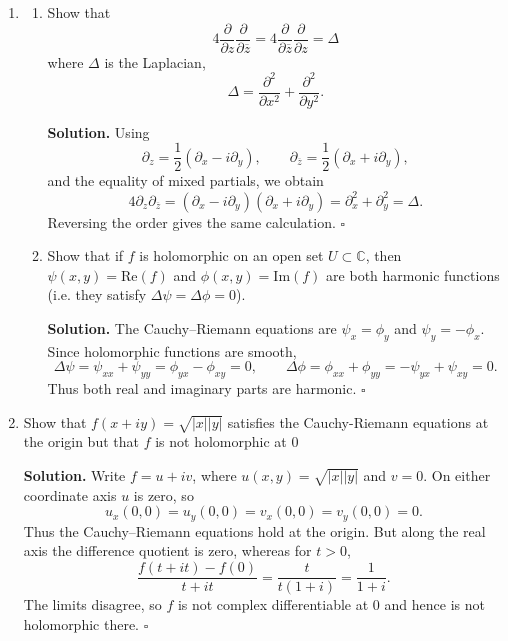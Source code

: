 \documentclass[12pt, reqno]{amsart}
\theoremstyle{definition}
\newenvironment{solution}{\par\smallskip\noindent\textbf{Solution.}}{\hfill$\square$\par\medskip}
\numberwithin{equation}{subsection}
\renewcommand{\Re}{\mathrm{Re}}
\renewcommand{\Im}{\mathrm{Im}}
\numberwithin{equation}{section}
\begin{document}
\begin{enumerate}
\item \begin{enumerate}
\item Show that $$4 \frac{\partial}{\partial z} \frac{\partial}{\partial \overline{z}} = 4 \frac{\partial}{\partial \overline{z}} \frac{\partial}{\partial z} = \Delta $$ where $\Delta$ is the Laplacian, $$ \Delta = \frac{\partial^2}{\partial x^2} + \frac{\partial^2}{\partial y^2} .$$
\begin{solution}
Using
\[\partial_z=\frac12(\partial_x-i\partial_y),\qquad
\partial_{\overline z}=\frac12(\partial_x+i\partial_y),\]
and the equality of mixed partials, we obtain
\[
4\partial_z\partial_{\overline z}
=(\partial_x-i\partial_y)(\partial_x+i\partial_y)
=\partial_x^2+\partial_y^2=\Delta.
\]
Reversing the order gives the same calculation.
\end{solution}
\item Show that if $f$ is holomorphic on an open set $U \subset \mathbb{C}$, then $\psi(x, y) = \Re(f)$ and $\phi(x, y) = \Im(f)$ are both harmonic functions (i.e. they satisfy $\Delta \psi = \Delta \phi = 0$).
\begin{solution}
The Cauchy--Riemann equations are $\psi_x=\phi_y$ and
$\psi_y=-\phi_x$.  Since holomorphic functions are smooth,
\[
\Delta\psi=\psi_{xx}+\psi_{yy}=\phi_{yx}-\phi_{xy}=0,
\qquad
\Delta\phi=\phi_{xx}+\phi_{yy}=-\psi_{yx}+\psi_{xy}=0.
\]
Thus both real and imaginary parts are harmonic.
\end{solution}
\end{enumerate}

\item Show that $f(x+ i y) = \sqrt{|x| | y |}$ satisfies the Cauchy-Riemann equations at the origin but that $f$ is not holomorphic at $0$
\begin{solution}
Write $f=u+iv$, where $u(x,y)=\sqrt{|x||y|}$ and $v=0$.  On either
coordinate axis $u$ is zero, so
\[u_x(0,0)=u_y(0,0)=v_x(0,0)=v_y(0,0)=0.\]
Thus the Cauchy--Riemann equations hold at the origin.  But along the real
axis the difference quotient is zero, whereas for $t>0$,
\[
\frac{f(t+it)-f(0)}{t+it}=\frac{t}{t(1+i)}=\frac1{1+i}.
\]
The limits disagree, so $f$ is not complex differentiable at $0$ and
hence is not holomorphic there.
\end{solution}


\end{enumerate}
\end{document}
